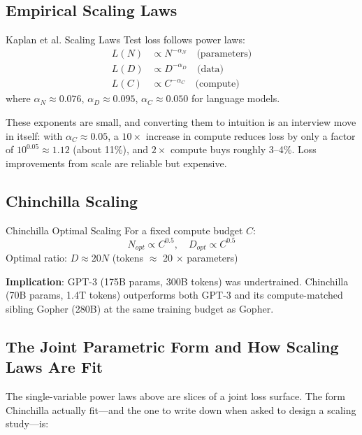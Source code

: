\subsection{Empirical Scaling Laws}

\begin{mathresult}{Kaplan et al. Scaling Laws}
Test loss follows power laws:
\begin{align}
L(N) &\propto N^{-\alpha_N} \quad \text{(parameters)} \\
L(D) &\propto D^{-\alpha_D} \quad \text{(data)} \\
L(C) &\propto C^{-\alpha_C} \quad \text{(compute)}
\end{align}
where $\alpha_N \approx 0.076$, $\alpha_D \approx 0.095$, $\alpha_C \approx 0.050$ for language models.
\end{mathresult}

These exponents are small, and converting them to intuition is an interview move in itself: with $\alpha_C \approx 0.05$, a $10\times$ increase in compute reduces loss by only a factor of $10^{0.05} \approx 1.12$ (about 11\%), and $2\times$ compute buys roughly 3--4\%. Loss improvements from scale are reliable but expensive.

\subsection{Chinchilla Scaling}

\begin{mathresult}{Chinchilla Optimal Scaling}
For a fixed compute budget $C$:
\begin{equation}
N_{opt} \propto C^{0.5}, \quad D_{opt} \propto C^{0.5}
\end{equation}
Optimal ratio: $D \approx 20N$ (tokens $\approx$ 20 × parameters)
\end{mathresult}

\textbf{Implication}: GPT-3 (175B params, 300B tokens) was undertrained. Chinchilla (70B params, 1.4T tokens) outperforms both GPT-3 and its compute-matched sibling Gopher (280B) at the same training budget as Gopher.

\subsection{The Joint Parametric Form and How Scaling Laws Are Fit}
\label{sec:scaling_fitting}

The single-variable power laws above are slices of a joint loss surface. The form Chinchilla actually fit---and the one to write down when asked to design a scaling study---is:

